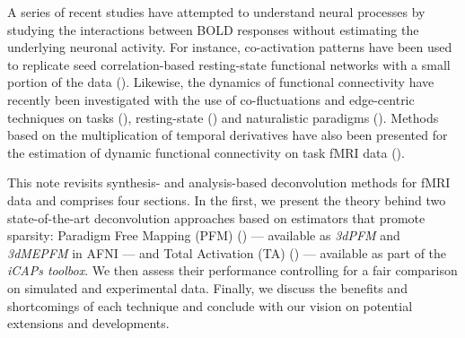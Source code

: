 A series of recent studies have attempted to understand neural processes by studying the interactions between BOLD responses without estimating the underlying neuronal activity. For instance, co-activation patterns have been used to replicate seed correlation-based resting-state functional networks with a small portion of the data (\citealt{liu2013time,liu2013decomposition,liu2018co,majeed2009spatiotemporal,majeed2011spatiotemporal,cifre2020revisiting,cifre2020further,zhang2020relationship}). Likewise, the dynamics of functional connectivity have recently been investigated with the use of co-fluctuations and edge-centric techniques on tasks (\citealt{faskowitz2021EdgecentricModelHarmonizing}), resting-state (\citealt{zamaniesfahlani2020HighamplitudeCofluctuationsCortical}) and naturalistic paradigms (\citealt{faskowitz2020EdgecentricFunctionalNetwork,betzel2020TemporalFluctuationsBrain}). Methods based on the multiplication of temporal derivatives have also been presented for the estimation of dynamic functional connectivity on task fMRI data (\citealt{shine2015estimation,shine2016dynamics}).

This note revisits synthesis- and analysis-based deconvolution methods for fMRI data and comprises four sections. In the first, we present the theory behind two state-of-the-art deconvolution approaches based on estimators that promote sparsity: Paradigm Free Mapping (PFM) (\citealt{caballerogaudes2013ParadigmFreeMapping}) --- available as \textit{3dPFM} and \textit{3dMEPFM} in AFNI --- and Total Activation (TA) (\citealt{karahanoglu2013TotalActivationFMRI}) --- available as part of the \textit{iCAPs toolbox}. We then assess their performance controlling for a fair comparison on simulated and experimental data. Finally, we discuss the benefits and shortcomings of each technique and conclude with our vision on potential extensions and developments.